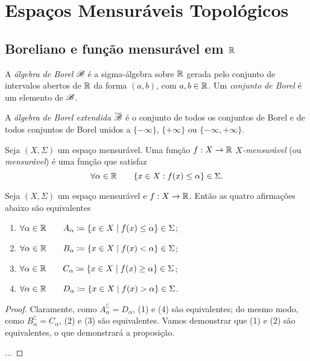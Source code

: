 \section{Espaços Mensuráveis Topológicos}

\subsection{Boreliano e função mensurável em $\mathbb{R}$}

\begin{defi}
	A \emph{álgebra de Borel} $\mathscr{B}$ é a sigma-álgebra sobre $\mathbb{R}$ gerada pelo conjunto de intervalos abertos de $\mathbb{R}$ da forma $(a,b)$, com $a,b \in \mathbb{R}$. Um \emph{conjunto de Borel} é um elemento de $\mathscr{B}$.
\end{defi}

\begin{defi}
	A \emph{álgebra de Borel extendida} $\overline{\mathscr{B}}$ é o conjunto de todos os conjuntos de Borel e de todos conjuntos de Borel unidos a $\{-\infty\}$, $\{+\infty\}$ ou $\{-\infty,+\infty\}$.
\end{defi}

\begin{defi}
	Seja $(X,\Sigma)$ um espaço mensurável. Uma função $f: X \to \mathbb{R}$ \emph{$X$-mensurável} (ou \emph{mensurável}) é uma função que satisfaz
	\begin{equation*}
	\forall \alpha \in \mathbb{R} \qquad \{x \in X : f(x) \leq \alpha\} \in \Sigma.
	\end{equation*}
\end{defi}

\begin{prop}
	Seja $(X,\Sigma)$ um espaço mensurável e $f: X \to \mathbb{R}$. Então as quatro afirmações abaixo são equivalentes
	\begin{enumerate}
	\item $\forall \alpha \in \R \qquad A_\alpha \coloneqq \set{x \in X}{f(x) \leq \alpha} \in \Sigma$;
	\item $\forall \alpha \in \R \qquad B_\alpha \coloneqq \set{x \in X}{f(x) < \alpha} \in \Sigma$;
	\item $\forall \alpha \in \R \qquad C_\alpha \coloneqq \set{x \in X}{f(x) \geq \alpha} \in \Sigma$;
	\item $\forall \alpha \in \R \qquad D_\alpha \coloneqq \set{x \in X}{f(x) > \alpha} \in \Sigma$.
	\end{enumerate}
\end{prop}
\begin{proof}
	Claramente, como $A_\alpha^\complement = D_\alpha$, (1) e (4) são equivalentes; do mesmo modo, como $B_\alpha^\complement = C_\alpha$, (2) e (3) são equivalentes. Vamos demonstrar que (1) e (2) são equivalentes, o que demonstrará a proposição.
	
	...	
\end{proof}

